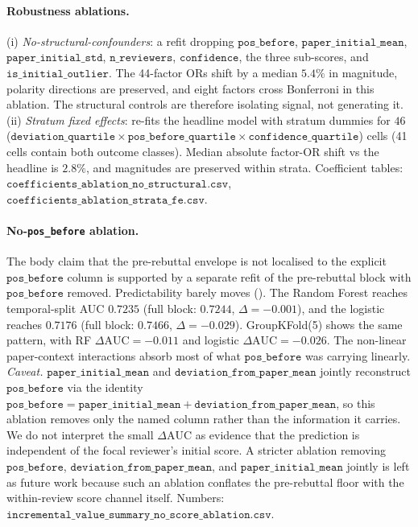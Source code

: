 \documentclass{article}
\newcommand{\code}[1]{\texttt{#1}}
\newcommand{\auc}{\text{AUC}}
\begin{document}
\paragraph{Robustness ablations.} (i) \emph{No-structural-confounders}: a refit dropping $\code{pos\_before}$, $\code{paper\_initial\_mean}$, $\code{paper\_initial\_std}$, $\code{n\_reviewers}$, $\code{confidence}$, the three sub-scores, and $\code{is\_initial\_outlier}$. The 44-factor ORs shift by a median $5.4\%$ in magnitude, polarity directions are preserved, and eight factors cross Bonferroni in this ablation. The structural controls are therefore isolating signal, not generating it. (ii) \emph{Stratum fixed effects}: re-fits the headline model with stratum dummies for $46$ ($\code{deviation\_quartile} \times \code{pos\_before\_quartile} \times \code{confidence\_quartile}$) cells (41 cells contain both outcome classes). Median absolute factor-OR shift vs the headline is $2.8\%$, and magnitudes are preserved within strata. Coefficient tables: $\code{coefficients\_ablation\_no\_structural.csv}$, $\code{coefficients\_ablation\_strata\_fe.csv}$.

\paragraph{No-\code{pos\_before} ablation.} The body claim that the pre-rebuttal envelope is not localised to the explicit $\code{pos\_before}$ column is supported by a separate refit of the pre-rebuttal block with $\code{pos\_before}$ removed. Predictability barely moves (). The Random Forest reaches temporal-split AUC $0.7235$ (full block: $0.7244$, $\Delta = -0.001$), and the logistic reaches $0.7176$ (full block: $0.7466$, $\Delta = -0.029$). GroupKFold(5) shows the same pattern, with RF $\Delta\auc = -0.011$ and logistic $\Delta\auc = -0.026$. The non-linear paper-context interactions absorb most of what $\code{pos\_before}$ was carrying linearly. \emph{Caveat.} $\code{paper\_initial\_mean}$ and $\code{deviation\_from\_paper\_mean}$ jointly reconstruct $\code{pos\_before}$ via the identity $\code{pos\_before} = \code{paper\_initial\_mean} + \code{deviation\_from\_paper\_mean}$, so this ablation removes only the named column rather than the information it carries. We do not interpret the small $\Delta\auc$ as evidence that the prediction is independent of the focal reviewer's initial score. A stricter ablation removing $\code{pos\_before}$, $\code{deviation\_from\_paper\_mean}$, and $\code{paper\_initial\_mean}$ jointly is left as future work because such an ablation conflates the pre-rebuttal floor with the within-review score channel itself. Numbers: $\code{incremental\_value\_summary\_no\_score\_ablation.csv}$.
\end{document}
